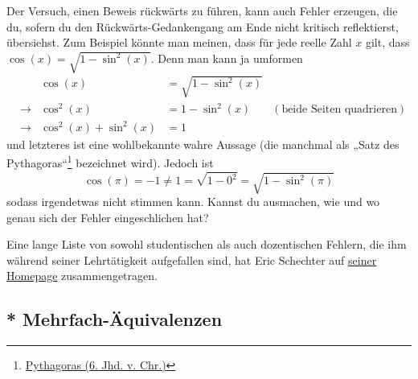 \begin{bem}
    Der Versuch, einen Beweis rückwärts zu führen, kann auch Fehler erzeugen, die du, sofern du den Rückwärts-Gedankengang am Ende nicht kritisch reflektierst, übersiehst. Zum Beispiel könnte man meinen, dass für jede reelle Zahl $x$ gilt, dass $\cos(x)=\sqrt{1-\sin^2(x)}$. Denn man kann ja umformen
    \begin{align*}
        &&\cos(x)& =\sqrt{1-\sin^2(x)} \\
        & \to & \cos^2(x)& = 1-\sin^2(x) & (\text{beide Seiten quadrieren}) \\
        & \to & \cos^2(x) + \sin^2(x) &= 1
    \end{align*}
    und letzteres ist eine wohlbekannte wahre Aussage (die manchmal als „Satz des Pythagoras“\footnote{\href{https://de.wikipedia.org/wiki/Pythagoras}{Pythagoras (6. Jhd. v. Chr.)}} bezeichnet wird). Jedoch ist
        \[ \cos(\pi) = -1 \neq 1 = \sqrt{1-0^2} = \sqrt{1-\sin^2(\pi)} \]
    sodass irgendetwas nicht stimmen kann. Kannst du ausmachen, wie und wo genau sich der Fehler eingeschlichen hat?
\end{bem}


\begin{bem}
 Eine lange Liste von sowohl studentischen als auch dozentischen Fehlern, die ihm während seiner Lehrtätigkeit aufgefallen sind, hat Eric Schechter auf \href{https://math.vanderbilt.edu/schectex/commerrs/}{seiner Homepage} zusammengetragen.
\end{bem}





\subsection*{* Mehrfach-Äquivalenzen}


